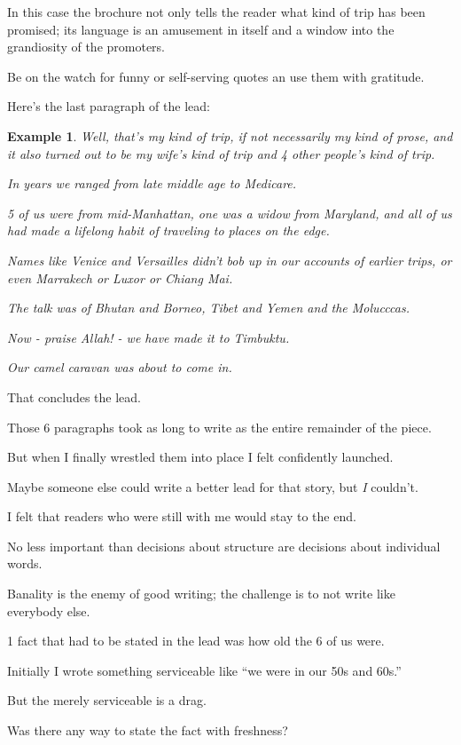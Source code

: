 \documentclass{book}
\numberwithin{equation}{section}
\newtheorem{example}{Example}[chapter]
\begin{document}
In this case the brochure not only tells the reader what kind of trip has been promised; its language is an amusement in itself and a window into the grandiosity of the promoters.

Be on the watch for funny or self-serving quotes an use them with gratitude.

Here's the last paragraph of the lead:
\begin{example}
    Well, that's my kind of trip, if not necessarily my kind of prose, and it also turned out to be my wife's kind of trip and 4 other people's kind of trip.
    
    In years we ranged from late middle age to Medicare.
    
    5 of us were from mid-Manhattan, one was a widow from Maryland, and all of us had made a lifelong habit of traveling to places on the edge.
    
    Names like Venice and Versailles didn't bob up in our accounts of earlier trips, or even Marrakech or Luxor or Chiang Mai.
    
    The talk was of Bhutan and Borneo, Tibet and Yemen and the Molucccas.
    
    Now - praise Allah! - we have made it to Timbuktu.
    
    Our camel caravan was about to come in.
\end{example}
That concludes the lead.

Those 6 paragraphs took as long to write as the entire remainder of the piece.

But when I finally wrestled them into place I felt confidently launched.

Maybe someone else could write a better lead for that story, but \textit{I} couldn't.

I felt that readers who were still with me would stay to the end.

%
No less important than decisions about structure are decisions about individual words.

Banality is the enemy of good writing; the challenge is to not write like everybody else.

1 fact that had to be stated in the lead was how old the 6 of us were.

Initially I wrote something serviceable like ``we were in our 50s and 60s.''

But the merely serviceable is a drag.

Was there any way to state the fact with freshness?
\end{document}
